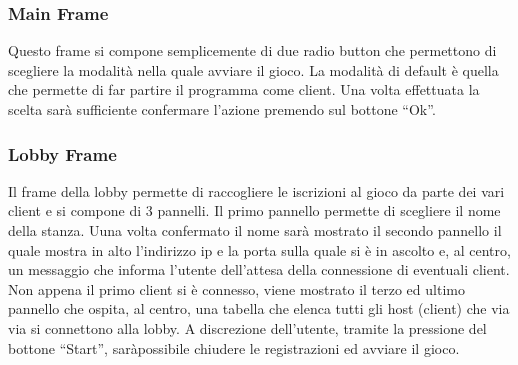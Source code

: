 \subsubsection{Main Frame}
\label{subsubsection:progettazione_main_frame}
Questo frame si compone semplicemente di due radio button che permettono di
scegliere la modalità nella quale avviare il gioco. La modalità di default è
quella che permette di far partire il programma come client. Una volta
effettuata la scelta sarà sufficiente confermare l'azione premendo sul bottone
``Ok''.

\subsubsection{Lobby Frame}
\label{subsubsection:progettazione_lobby_frame}
Il frame della lobby permette di raccogliere le iscrizioni al gioco da parte dei
vari client e si compone di 3 pannelli.\newline
Il primo pannello permette di scegliere il nome della stanza. Uuna volta
confermato il nome sarà mostrato il secondo pannello il quale mostra in alto
l'indirizzo ip e la porta sulla quale si è in ascolto e, al centro, un messaggio
che informa l'utente dell'attesa della connessione di eventuali client. Non
appena il primo client si è connesso, viene mostrato il terzo ed ultimo pannello
che ospita, al centro, una tabella che elenca tutti gli host (client) che via
via si connettono alla lobby. A discrezione dell'utente, tramite la pressione
del bottone ``Start'', saràpossibile chiudere le registrazioni ed avviare il
gioco.

